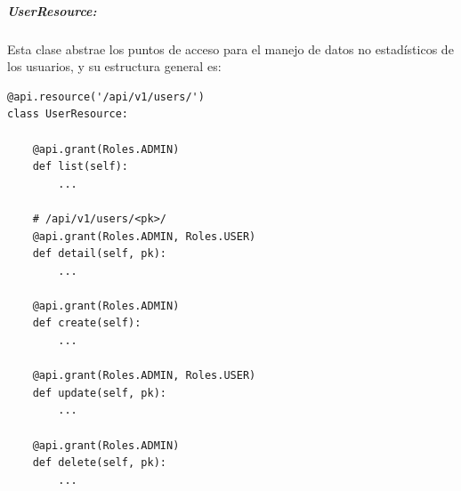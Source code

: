 \documentclass[11pt,letterpaper]{article}
\begin{document}
\subparagraph{UserResource:\\} Esta clase abstrae los puntos de acceso para el manejo de datos no estadísticos de los usuarios, y su estructura general es:
\begin{lstlisting}
@api.resource('/api/v1/users/')
class UserResource:

    @api.grant(Roles.ADMIN)
    def list(self):
        ...

    # /api/v1/users/<pk>/
    @api.grant(Roles.ADMIN, Roles.USER)
    def detail(self, pk):
        ...

    @api.grant(Roles.ADMIN)
    def create(self):
        ...

    @api.grant(Roles.ADMIN, Roles.USER)
    def update(self, pk):
        ...

    @api.grant(Roles.ADMIN)
    def delete(self, pk):
        ...
\end{lstlisting}
\end{document}
